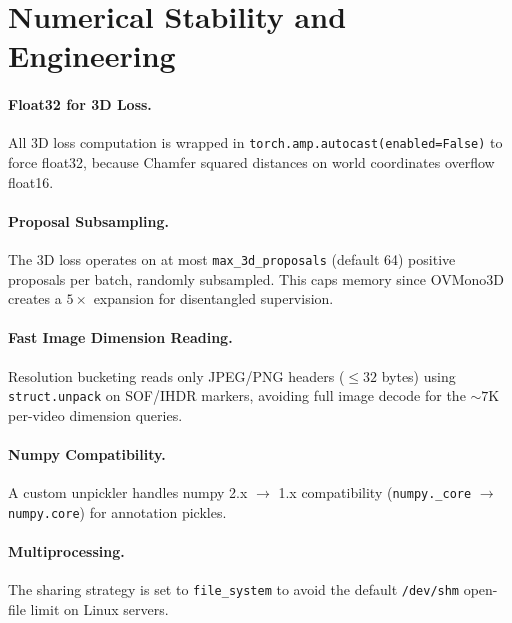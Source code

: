 \documentclass[runningheads]{llncs}
\begin{document}
\section{Numerical Stability and Engineering}
\label{sec:engineering}

\paragraph{Float32 for 3D Loss.}  All 3D loss computation is wrapped in \texttt{torch.amp.autocast(enabled=False)} to force float32, because Chamfer squared distances on world coordinates overflow float16.

\paragraph{Proposal Subsampling.}  The 3D loss operates on at most \texttt{max\_3d\_proposals} (default 64) positive proposals per batch, randomly subsampled.  This caps memory since OVMono3D creates a $5\times$ expansion for disentangled supervision.

\paragraph{Fast Image Dimension Reading.}  Resolution bucketing reads only JPEG/PNG headers ($\leq 32$ bytes) using \texttt{struct.unpack} on SOF/IHDR markers, avoiding full image decode for the $\sim\!7$K per-video dimension queries.

\paragraph{Numpy Compatibility.}  A custom unpickler handles numpy 2.x $\to$ 1.x compatibility (\texttt{numpy.\_core} $\to$ \texttt{numpy.core}) for annotation pickles.

\paragraph{Multiprocessing.}  The sharing strategy is set to \texttt{file\_system} to avoid the default \texttt{/dev/shm} open-file limit on Linux servers.




\end{document}
